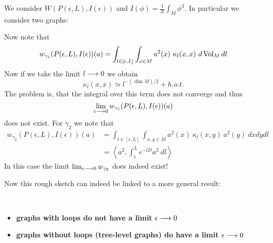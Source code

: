 \begin{sketch}
  We consider $W(P(\epsilon,L), I(\epsilon))$ and $I(\phi) = \frac{1}{3!} \int_M \phi^3$. In particular we consider two graphs:

  \begin{center}
  \end{center}

  Now note that
  $$ w_{\gamma_1} (P(\epsilon,L), I(\epsilon))(a) = \int_{l\in[\epsilon,L]} \int_{x\in M} a^2(x) \ \kappa_l(x,x) \ d\vol_M dl$$
  Now if we take the limit $l \longrightarrow 0$ we obtain
  $$ \kappa_l(x,x) \simeq l^{-(\dim M)/2} + h.o.t. $$
  The problem is, that the integral over this term does not converge and thus
  $$ \lim_{\epsilon \lra 0} w_{\gamma_1} (P(\epsilon,L), I(\epsilon))(a) $$
  does not exist. For $\gamma_2$ we note that
  \begin{align*}
    w_{\gamma_2} (P(\epsilon,L), I(\epsilon))(a) &= \int_{l\in[\epsilon,L]} \int_{x,y\in M} a^2(x) \ \kappa_l(x,y) \ a^2(y) \ dx dy dl \\
    &= \left\langle a^2, \int_\epsilon^L e^{-lD} a^2 \ dl \right\rangle
  \end{align*}
  In this case the limit $\lim_{\epsilon \lra 0} w_{\gamma_2}$ does indeed exist!
\end{sketch}

Now this rough sketch can indeed be linked to a more general result:

\begin{fact}~
\begin{itemize}
  \item \textbf{graphs with loops do not have a limit} $\epsilon \lra 0$
  \item \textbf{graphs without loops (tree-level graphs) do have a limit} $\epsilon \lra 0$
\end{itemize}
\end{fact}

